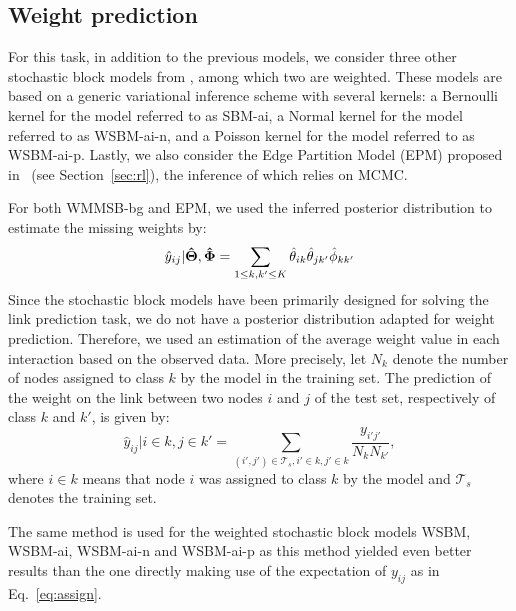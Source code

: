 \subsection{Weight prediction}

For this task, in addition to the previous models, we consider three other stochastic block models from \cite{aicher2014learning}, among which two are weighted. These models are based on a generic variational inference scheme with several kernels: a Bernoulli kernel for the model referred to as SBM-ai, a Normal kernel for the model referred to as WSBM-ai-n, and a Poisson kernel for the model referred to as WSBM-ai-p. Lastly, we also consider the Edge Partition Model (EPM) proposed in~\cite{zhou2015} (see Section~\ref{sec:rl}), the inference of which relies on MCMC.

For both WMMSB-bg and EPM, we used the inferred posterior distribution to estimate the missing weights by:
%
\begin{equation}\label{eq:assign}
\hat y_{ij} | \boldsymbol{\hat\Theta}, \boldsymbol{\hat\Phi} = \sum_{1 \le k,k' \le K} \hat\theta_{ik} \hat\theta_{jk'} \hat\phi_{kk'}
\end{equation}
%
%
Since the stochastic block models have been primarily designed for solving the link prediction task, we do not have a posterior distribution adapted for weight prediction. Therefore, we used an estimation of the average weight value in each interaction based on the observed data. More precisely, let $N_k$ denote the number of nodes assigned to class $k$ by the model in the training set. The prediction of the weight on the link between two nodes $i$ and $j$ of the test set, respectively of class $k$ and $k'$, is given by:
%
\[
\hat y_{ij} | i \in k, j \in k' = \sum_{(i',j') \in \mathcal{T}_s, i' \in k, j' \in k} \frac{y_{i'j'}}{N_k N_{k'}},
\]
%
where $i \in k$ means that node $i$ was assigned to class $k$ by the model and $\mathcal{T}_s$ denotes the training set.
 
The same method is used for the weighted stochastic block models WSBM, WSBM-ai, WSBM-ai-n and WSBM-ai-p as this method yielded even better results than the one directly making use of the expectation of $y_{ij}$ as in Eq.~\ref{eq:assign}.

